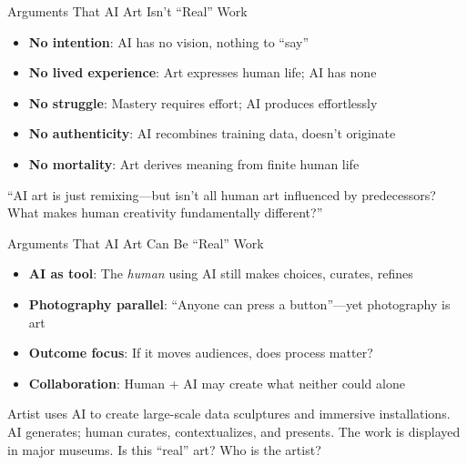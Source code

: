 ﻿\documentclass[aspectratio=169,11pt]{beamer}
\begin{document}
\begin{frame}{Arguments That AI Art Isn't ``Real'' Work}
\begin{itemize}
    \item \textbf{No intention}: AI has no vision, nothing to ``say''
    \item \textbf{No lived experience}: Art expresses human life; AI has none
    \item \textbf{No struggle}: Mastery requires effort; AI produces effortlessly
    \item \textbf{No authenticity}: AI recombines training data, doesn't originate
    \item \textbf{No mortality}: Art derives meaning from finite human life
\end{itemize}

\vspace{0.2em}
\begin{objectionbox}[Objection]
\small
``AI art is just remixing---but isn't all human art influenced by predecessors? What makes human creativity fundamentally different?''
\end{objectionbox}
\end{frame}

\begin{frame}{Arguments That AI Art Can Be ``Real'' Work}
\begin{itemize}
    \item \textbf{AI as tool}: The \emph{human} using AI still makes choices, curates, refines
    \item \textbf{Photography parallel}: ``Anyone can press a button''---yet photography is art
    \item \textbf{Outcome focus}: If it moves audiences, does process matter?
    \item \textbf{Collaboration}: Human + AI may create what neither could alone
\end{itemize}

\vspace{0.2em}
\begin{casestudybox}
\scriptsize
Artist uses AI to create large-scale data sculptures and immersive installations. AI generates; human curates, contextualizes, and presents. The work is displayed in major museums. Is this ``real'' art? Who is the artist?
\end{casestudybox}
\end{frame}
\end{document}
